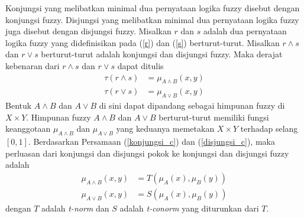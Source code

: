 \noindent Konjungsi yang melibatkan minimal dua pernyataan logika fuzzy disebut dengan konjungsi fuzzy. Disjungsi yang melibatkan minimal dua pernyataan logika fuzzy juga disebut dengan disjungsi fuzzy. Misalkan $r$ dan $s$ adalah dua pernyataan logika fuzzy yang didefinisikan pada (\ref{r}) dan (\ref{s}) berturut-turut. Misalkan $r \land s$ dan $r \lor s$ berturut-turut adalah konjungsi dan disjungsi fuzzy. Maka derajat kebenaran dari $r \land s$ dan $r \lor s$ dapat ditulis
\begin{align*}
    \tau(r \land s) &= \mu_{A \land B}(x,y)\\
    \tau(r \lor s) &= \mu_{A \lor B}(x,y)
\end{align*}
Bentuk $A \land B$ dan $A \lor B$ di sini dapat dipandang sebagai himpunan fuzzy di $X \times Y$. Himpunan fuzzy $A \land B$ dan $A \lor B$ berturut-turut memiliki fungsi keanggotaan $\mu_{A \land B}$ dan $\mu_{A \lor B}$ yang keduanya memetakan $X \times Y$ terhadap selang $[0,1]$. Berdasarkan Persamaan (\ref{konjungsi_c}) dan (\ref{disjungsi_c}), maka perluasan dari konjungsi dan disjungsi pokok ke konjungsi dan disjungsi fuzzy adalah
\begin{align*}
    \mu_{A \land B}(x,y) &= T\left(\mu_A(x),\mu_B(y)\right)\\
    \mu_{A \lor B}(x,y) &= S\left(\mu_A(x),\mu_B(y)\right)
\end{align*}
dengan $T$ adalah \emph{t-norm} dan $S$ adalah \emph{t-conorm} yang diturunkan dari $T$.

